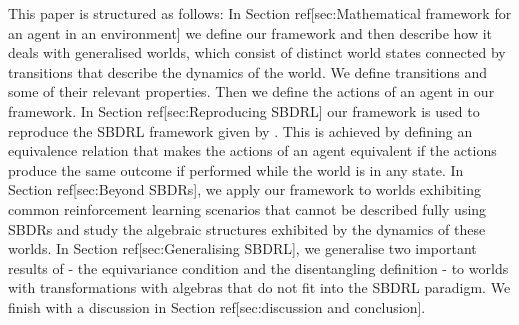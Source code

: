 This paper is structured as follows:
In Section ref[sec:Mathematical framework for an agent in an environment] we define our framework and then describe how it deals with generalised worlds, which consist of distinct world states connected by transitions that describe the dynamics of the world.
We define transitions and some of their relevant properties.
Then we define the actions of an agent in our framework.
In Section ref[sec:Reproducing SBDRL] our framework is used to reproduce the SBDRL framework given by \autocite{Higgins2018}.
This is achieved by defining an equivalence relation that makes the actions of an agent equivalent if the actions produce the same outcome if performed while the world is in any state.
In Section ref[sec:Beyond SBDRs], we apply our framework to worlds exhibiting common reinforcement learning scenarios that cannot be described fully using SBDRs and study the algebraic structures exhibited by the dynamics of these worlds.
In Section ref[sec:Generalising SBDRL], we generalise two important results of \autocite{Higgins2018} - the equivariance condition and the disentangling definition - to worlds with transformations with algebras that do not fit into the SBDRL paradigm.
We finish with a discussion in Section ref[sec:discussion and conclusion].

